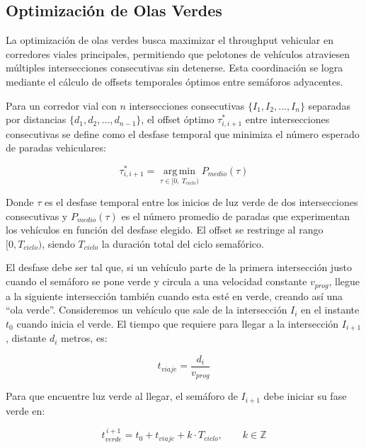 \documentclass[12pt,a4paper,oneside]{report}
\begin{document}
\subsection{Optimización de Olas Verdes}\label{optimizaciuxf3n-de-olas-verdes}

La optimización de olas verdes busca maximizar el throughput vehicular en corredores viales principales, permitiendo que pelotones de vehículos atraviesen múltiples intersecciones consecutivas sin detenerse. Esta coordinación se logra mediante el cálculo de offsets temporales óptimos entre semáforos adyacentes.

Para un corredor vial con \(n\) intersecciones consecutivas \(\{I_{1}, I_{2}, \ldots, I_{n}\}\) separadas por distancias \(\{d_{1}, d_{2}, \ldots, d_{n-1}\}\), el offset óptimo \(\tau_{i,i+1}^{*}\) entre intersecciones consecutivas se define como el desfase temporal que minimiza el número esperado de paradas vehiculares:

\begin{equation}
\tau_{i,i + 1}^{*} = \operatorname*{arg\,min}_{\tau \in [0,\ T_{ciclo})} P_{medio}(\tau)
\label{eq:offsetopt}
\end{equation}

Donde \(\tau\) es el desfase temporal entre los inicios de luz verde de dos intersecciones consecutivas y \(P_{medio}(\tau)\) es el número promedio de paradas que experimentan los vehículos en función del desfase elegido. El offset se restringe al rango \([0, T_{ciclo})\), siendo \(T_{ciclo}\) la duración total del ciclo semafórico.

El desfase debe ser tal que, si un vehículo parte de la primera intersección justo cuando el semáforo se pone verde y circula a una velocidad constante \(v_{prog}\), llegue a la siguiente intersección también cuando esta esté en verde, creando así una ``ola verde''. Consideremos un vehículo que sale de la intersección \(I_{i}\) en el instante \(t_{0}\) cuando inicia el verde. El tiempo que requiere para llegar a la intersección \(I_{i+1}\), distante \(d_{i}\) metros, es:

\begin{equation}
t_{viaje} = \frac{d_{i}}{v_{prog}}
\label{eq:tviaje}
\end{equation}

Para que encuentre luz verde al llegar, el semáforo de \(I_{i+1}\) debe iniciar su fase verde en:

\begin{equation}
t_{verde}^{\,i + 1} = t_{0} + t_{viaje} + k \cdot T_{ciclo}, \qquad k \in \mathbb{Z}
\end{equation}
\end{document}
